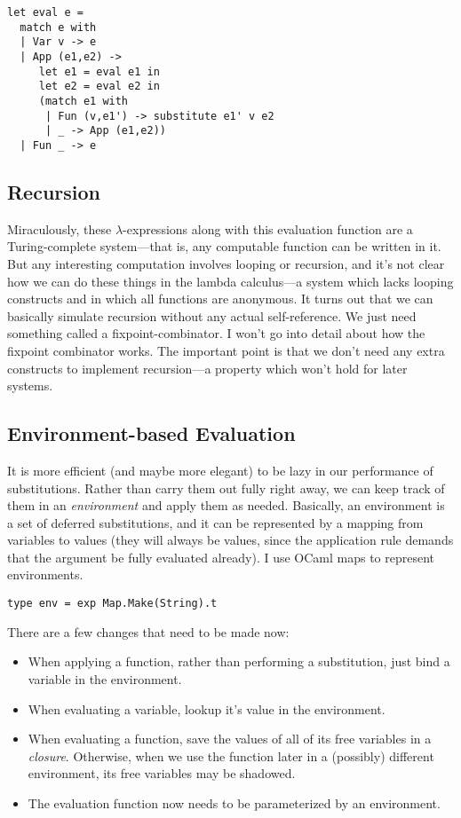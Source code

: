 \documentclass[pageno]{jpaper}
\begin{document}
{\begin{lstlisting}
let eval e =
  match e with
  | Var v -> e
  | App (e1,e2) ->
     let e1 = eval e1 in
     let e2 = eval e2 in
     (match e1 with
      | Fun (v,e1') -> substitute e1' v e2
      | _ -> App (e1,e2))
  | Fun _ -> e

\end{lstlisting}

\subsection{Recursion}
Miraculously, these $\lambda$-expressions along with this evaluation function are a Turing-complete system---that is, any computable function can be written in it.
But any interesting computation involves looping or recursion, and it's not clear how we can do these
things in the lambda calculus---a system which lacks looping constructs and in which all functions are anonymous. It turns out that we can basically simulate recursion without any actual self-reference.
We just need something called a fixpoint-combinator.  I won't go into detail about how the fixpoint
combinator works.  The important point is that we don't need any extra constructs to implement recursion---a
property which won't hold for later systems.

\subsection{Environment-based Evaluation}
It is more efficient (and maybe more elegant) to be lazy in our performance of substitutions.
Rather than carry them out fully right away, we can keep track of them in an \textit{environment}
and apply them as needed.  Basically, an environment is a set of deferred substitutions, and it can
be represented by a mapping from variables to values (they will always be values,
since the application rule demands that the argument be fully evaluated already).
I use OCaml maps to represent environments.

\begin{lstlisting}
type env = exp Map.Make(String).t
\end{lstlisting}

There are a few changes that need to be made now:

\begin{itemize}
\item When applying a function, rather than performing a substitution, just bind a variable in
the environment.
\item When evaluating a variable, lookup it's value in the environment.
\item When evaluating a function, save the values of all of its free variables in a \textit{closure}.
Otherwise, when we use the function later in a (possibly) different environment, its free variables
may be shadowed.
\item The evaluation function now needs to be parameterized by an environment.
\end{itemize}

}
\end{document}
